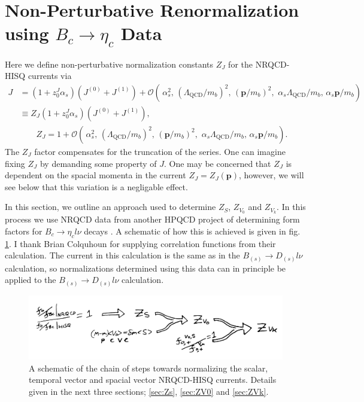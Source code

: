 \section{Non-Perturbative Renormalization using $B_c\to \eta_c$ Data}
\label{sec:Bcetac}

Here we define non-perturbative normalization constants $Z_J$ for the NRQCD-HISQ currents via 
\begin{align}
  \nonumber
	J &= ( 1 + z^J_0 \alpha_s )( J^{(0)} + J^{(1)} ) + \mathcal{O}(\, \alpha_s^2, \, (\Lambda_{\text{QCD}}/m_b)^2, \, ({\textbf{p}}/m_b)^2,\,\,\alpha_s \Lambda_{\text{QCD}} / m_b,\, \alpha_s {\textbf{p}}/m_b ) \\ \nonumber
	&\equiv Z_{J}( 1 + z^J_0 \alpha_s )( J^{(0)} + J^{(1)} ), \\  &\quad\quad Z_{J} = 1 +  \mathcal{O}(\, \alpha_s^2, \, (\Lambda_{\text{QCD}}/m_b)^2, \, ({\textbf{p}}/m_b)^2,\,\,\alpha_s \Lambda_{\text{QCD}} / m_b,\, \alpha_s {\textbf{p}}/m_b ).
	\label{eq:overall}
\end{align}
The $Z_J$ factor compensates for the truncation of the series. One can imagine fixing $Z_J$ by demanding some property of $J$. One may be concerned that $Z_J$ is dependent on the spacial momenta in the current $Z_J=Z_J({\textbf{p}})$, however, we will see below that this variation is a negligable effect.

In this section, we outline an approach used to determine $Z_S$, $Z_{V_0}$ and $Z_{V_k}$. In this process we use NRQCD data from another HPQCD project of determining form factors for $B_c \to \eta_c l\nu$ decays \cite{Colquhoun:2016osw}. A schematic of how this is achieved is given in fig. \ref{fig:normalization_chain}. I thank Brian Colquhoun for supplying correlation functions from their calculation. The current in this calculation is the same as in the $B_{(s)}\to D_{(s)}l\nu$ calculation, so normalizations determined using this data can in principle be applied to the $B_{(s)}\to D_{(s)}l\nu$ calculation.

\begin{figure}[htb!]
\hspace{-5pt}
    \includegraphics[width=1.0\textwidth]{images/nrqcd/normalization_chain.jpg}
  \caption{A schematic of the chain of steps towards normalizing the scalar, temporal vector and spacial vector NRQCD-HISQ currents. Details given in the next three sections; \ref{sec:Zs}, \ref{sec:ZV0} and \ref{sec:ZVk}. \label{fig:normalization_chain}}
\end{figure}

